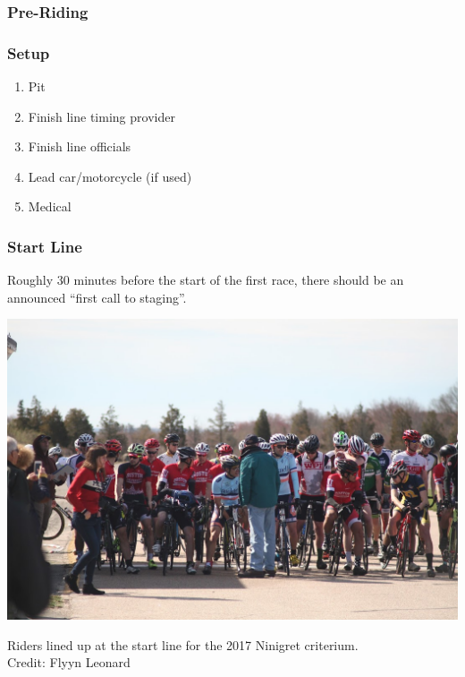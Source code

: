 \documentclass[
  letterpaper, %
  fontsize=10pt, %
  twoside=true,
  chapterentrydots=true, %
  numbers=noenddot,
  fontmethod=tex,
]{kaobook}
\begin{document}
\subsubsection{Pre-Riding}

\subsubsection{Setup}

\begin{enumerate}
  \item Pit
  \item Finish line timing provider
  \item Finish line officials
  \item Lead car/motorcycle (if used)
  \item Medical
\end{enumerate}

\subsubsection{Start Line}


Roughly 30 minutes %
before the start of the first race, there should be an announced ``first call to staging''.

\begin{marginfigure}
\includegraphics{2017_start_line.jpg}
\caption[Riders lined up at a criterium start line]{
          Riders lined up at the start line for the 2017 Ninigret criterium.\\
          Credit: Flyyn Leonard}
\end{marginfigure}
\end{document}

